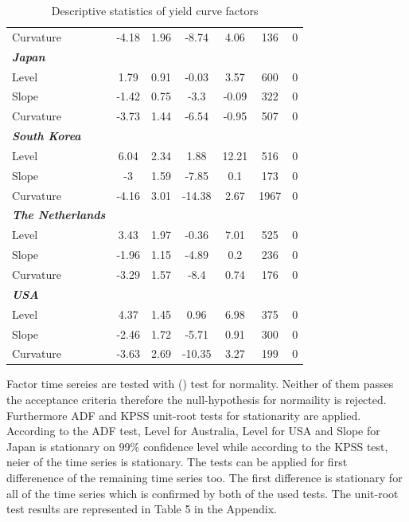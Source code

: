 \documentclass[12pt,bibliography=totoc]{article}
\begin{document}
\begin{table}[H]
\begin{tabular}{l c c c c c c}
Curvature & -4.18 & 1.96 & -8.74 & 4.06 & 136 & 0\\
\textit{\textbf{Japan}} & & & & & & \\
Level & 1.79 & 0.91 & -0.03 & 3.57 & 600 & 0\\
Slope & -1.42 & 0.75 & -3.3 & -0.09 & 322 & 0\\
Curvature & -3.73 & 1.44 & -6.54 & -0.95 & 507 & 0\\
\textit{\textbf{South Korea}} & & & & & & \\
Level & 6.04 & 2.34 & 1.88 & 12.21 & 516 & 0\\
Slope & -3 & 1.59 & -7.85 & 0.1 & 173 & 0\\
Curvature & -4.16 & 3.01 & -14.38 & 2.67 & 1967 & 0\\
\textit{\textbf{The Netherlands}} & & & & & & \\
Level & 3.43 & 1.97 & -0.36 & 7.01 & 525 & 0\\
Slope & -1.96 & 1.15 & -4.89 & 0.2 & 236 & 0\\
Curvature & -3.29 & 1.57 & -8.4 & 0.74 & 176 & 0\\
\textit{\textbf{USA}} & & & & & & \\
Level & 4.37 & 1.45 & 0.96 & 6.98 & 375 & 0\\
Slope & -2.46 & 1.72 & -5.71 & 0.91 & 300 & 0\\
Curvature & -3.63 & 2.69 & -10.35 & 3.27 & 199 & 0\\


\hline%
\end{tabular}
\label{table:nonlin}%

\caption{Descriptive statistics of yield curve factors}%
\end{table}


\bigskip


Factor time sereies are tested with (\cite{bera1981efficient}) test for normality. Neither of them passes the acceptance criteria therefore the null-hypothesis for normaility is rejected. Furthermore ADF and KPSS unit-root tests for stationarity are applied. According to the ADF test, Level for Australia, Level for USA and Slope for Japan is stationary on 99\% confidence level while according to the KPSS test, neier of the time series is stationary. The tests can be applied for first differenence of the remaining time series too. The first difference is stationary for all of the time series which is confirmed by both of the used tests. The unit-root test results are represented in Table 5 in the Appendix.
\end{document}
